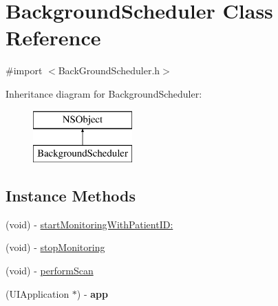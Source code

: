 \hypertarget{interface_background_scheduler}{\section{Background\-Scheduler Class Reference}
\label{interface_background_scheduler}
}


{\ttfamily \#import $<$Back\-Ground\-Scheduler.\-h$>$}

Inheritance diagram for Background\-Scheduler\-:\begin{figure}[H]
\begin{center}
\leavevmode
\includegraphics[height=2.000000cm]{interface_background_scheduler}
\end{center}
\end{figure}
\subsection*{Instance Methods}
\begin{DoxyCompactItemize}
\item 
(void) -\/ \hyperlink{interface_background_scheduler_a50173200d1b7dfc44b1d2d2a49ca75be}{start\-Monitoring\-With\-Patient\-I\-D\-:}
\item 
(void) -\/ \hyperlink{interface_background_scheduler_afa9c1aaf67ac8d9f5fd17a43475777eb}{stop\-Monitoring}
\item 
(void) -\/ \hyperlink{interface_background_scheduler_a11390d5d6bb62b2c565ca9205d045b2a}{perform\-Scan}
\item 
\hypertarget{interface_background_scheduler_a393315828a032dece36a93c53ee203d0}{(U\-I\-Application $\ast$) -\/ {\bfseries app}}\label{interface_background_scheduler_a393315828a032dece36a93c53ee203d0}

\end{DoxyCompactItemize}
